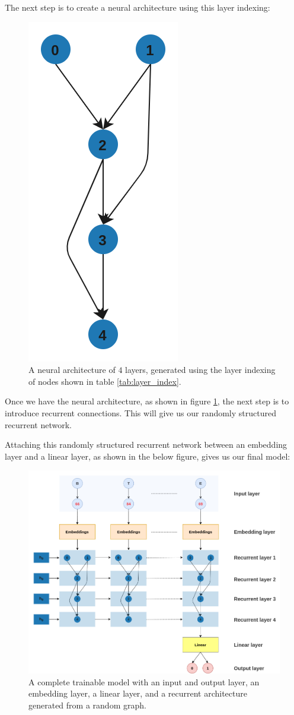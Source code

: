 The next step is to create a neural architecture using this layer indexing:

\begin{figure}[h]
	\centering
	\includegraphics[width=0.25\linewidth]{images/experiments/neural_arc.png}
	\caption[Neural architecture generated using the layer indexing]%
	{A neural architecture of $4$ layers, generated using the layer indexing of nodes shown in table \ref{tab:layer_index}.}
	\label{fig:neural_arc}
\end{figure}

Once we have the neural architecture, as shown in figure \ref{fig:neural_arc}, the next step is to introduce recurrent connections. This will give us our randomly structured recurrent network.

Attaching this randomly structured recurrent network between an embedding layer and a linear layer, as shown in the below figure, gives us our final model:

\begin{figure}[h]
	\centering
	\includegraphics[width=0.8\linewidth]{images/experiments/recurrent_arc.png}
	\caption[Complete model with recurrent architecture generated from a random graph]%
	{A complete trainable model with an input and output layer, an embedding layer, a linear layer, and a recurrent architecture generated from a random graph.}
	\label{fig:recurrent_arc}
\end{figure}

